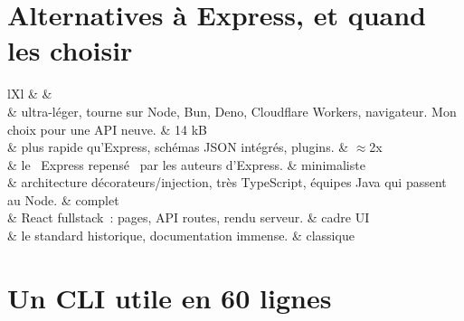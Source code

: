 \section{Alternatives \`a Express, et quand les choisir}

\begin{tabz}{lXl}
  \headrow {} \&  \&  \\
  \midrule
   \& ultra-l\'eger, tourne sur Node, Bun, Deno, Cloudflare Workers, navigateur. Mon choix pour une API neuve. \& 14 kB \\
   \& plus rapide qu'Express, sch\'emas JSON int\'egr\'es, plugins. \& $\approx$2x \\
   \& le \og ~Express repens\'e~ \fg{} par les auteurs d'Express. \& minimaliste \\
   \& architecture d\'ecorateurs/injection, tr\`es TypeScript, \'equipes Java qui passent au Node. \& complet \\
   \& React fullstack~: pages, API routes, rendu serveur. \& cadre UI \\
   \& le standard historique, documentation immense. \& classique \\
\end{tabz}

\section{Un CLI utile en 60 lignes}

